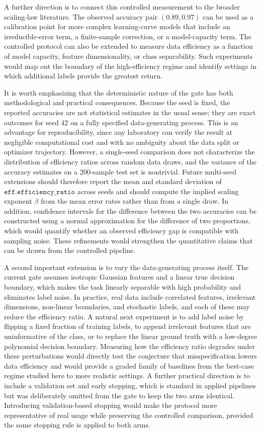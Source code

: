 \documentclass[10pt]{article}
\begin{document}
A further direction is to connect this controlled measurement to the broader scaling-law literature. The observed accuracy pair \((0.89, 0.97)\) can be used as a calibration point for more complex learning-curve models that include an irreducible-error term, a finite-sample correction, or a model-capacity term. The controlled protocol can also be extended to measure data efficiency as a function of model capacity, feature dimensionality, or class separability. Such experiments would map out the boundary of the high-efficiency regime and identify settings in which additional labels provide the greatest return.

It is worth emphasizing that the deterministic nature of the gate has both methodological and practical consequences. Because the seed is fixed, the reported accuracies are not statistical estimates in the usual sense; they are exact outcomes for seed 42 on a fully specified data-generating process. This is an advantage for reproducibility, since any laboratory can verify the result at negligible computational cost and with no ambiguity about the data split or optimizer trajectory. However, a single-seed comparison does not characterize the distribution of efficiency ratios across random data draws, and the variance of the accuracy estimates on a 200-sample test set is nontrivial. Future multi-seed extensions should therefore report the mean and standard deviation of \(\texttt{eff.efficiency\_ratio}\) across seeds and should compute the implied scaling exponent \(\beta\) from the mean error rates rather than from a single draw. In addition, confidence intervals for the difference between the two accuracies can be constructed using a normal approximation for the difference of two proportions, which would quantify whether an observed efficiency gap is compatible with sampling noise. These refinements would strengthen the quantitative claims that can be drawn from the controlled pipeline.

A second important extension is to vary the data-generating process itself. The current gate assumes isotropic Gaussian features and a linear true decision boundary, which makes the task linearly separable with high probability and eliminates label noise. In practice, real data include correlated features, irrelevant dimensions, non-linear boundaries, and stochastic labels, and each of these may reduce the efficiency ratio. A natural next experiment is to add label noise by flipping a fixed fraction of training labels, to append irrelevant features that are uninformative of the class, or to replace the linear ground truth with a low-degree polynomial decision boundary. Measuring how the efficiency ratio degrades under these perturbations would directly test the conjecture that misspecification lowers data efficiency and would provide a graded family of baselines from the best-case regime studied here to more realistic settings. A further practical direction is to include a validation set and early stopping, which is standard in applied pipelines but was deliberately omitted from the gate to keep the two arms identical. Introducing validation-based stopping would make the protocol more representative of real usage while preserving the controlled comparison, provided the same stopping rule is applied to both arms.
\end{document}
